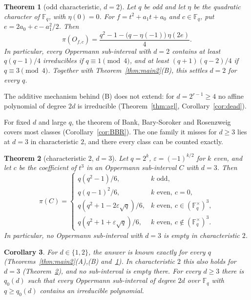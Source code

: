 \documentclass[11pt,a4paper]{amsart}
\newtheorem{theorem}{Theorem}[section]
\newtheorem{corollary}[theorem]{Corollary}
\theoremstyle{definition}
\theoremstyle{remark}
\newcommand{\F}{\mathbb{F}}
\begin{document}
\begin{theorem}[odd characteristic, $d=2$]\label{thm:odd2}
Let $q$ be odd and let $\eta$ be the quadratic character of $\F_q$, with $\eta(0)=0$. For $f=t^2+a_1t+a_0$ and
$c\in\F_q$, put $e=2a_0+c-a_1^2/2$. Then
\[
\pi(O_{f,c})=\frac{q^2-1-\bigl(q-\eta(-1)\bigr)\,\eta(2e)}{4}.
\]
In particular, every Oppermann sub-interval with $d=2$ contains at least $q(q-1)/4$ irreducibles if
$q\equiv1\pmod4$, and at least $(q+1)(q-2)/4$ if $q\equiv3\pmod4$. Together with Theorem~\ref{thm:main2}(B), this
settles $d=2$ for every $q$.
\end{theorem}

The additive mechanism behind (B) does not extend: for $d=2^{r-1}\ge4$ no affine polynomial of degree $2d$ is
irreducible (Theorem~\ref{thm:agl}, Corollary~\ref{cor:dead}).

For fixed $d$ and large $q$, the theorem of Bank, Bary-Soroker and Rosenzweig \cite{BBR} covers most classes
(Corollary~\ref{cor:BBR}). The one family it misses for $d\ge3$ lies at $d=3$ in characteristic $2$, and there every
class can be counted exactly.

\begin{theorem}[characteristic $2$, $d=3$]\label{thm:intro_p3zero}
Let $q=2^k$, $\varepsilon=(-1)^{k/2}$ for $k$ even, and let $c$ be the coefficient of $t^3$ in an Oppermann
sub-interval $C$ with $d=3$. Then
\[
\pi(C)=\begin{cases}
q(q^2-1)/6, & k\text{ odd},\\
q(q-1)^2/6, & k\text{ even},\ c=0,\\
q(q^2+1-2\varepsilon\sqrt q)/6, & k\text{ even},\ c\in(\F_q^\times)^3,\\
q(q^2+1+\varepsilon\sqrt q)/6, & k\text{ even},\ c\notin(\F_q^\times)^3.
\end{cases}
\]
In particular, no Oppermann sub-interval with $d=3$ is empty in characteristic $2$.
\end{theorem}

\begin{corollary}\label{cor:largeq}
For $d\in\{1,2\}$, the answer is known exactly for every $q$ (Theorems~\ref{thm:main2}(A),(B) and~\ref{thm:odd2}).
In characteristic $2$ this also holds for $d=3$ (Theorem~\ref{thm:intro_p3zero}), and no sub-interval is empty there.
For every $d\ge3$ there is $q_0(d)$ such that every Oppermann sub-interval of degree $2d$ over $\F_q$ with
$q\ge q_0(d)$ contains an irreducible polynomial.
\end{corollary}
\end{document}
